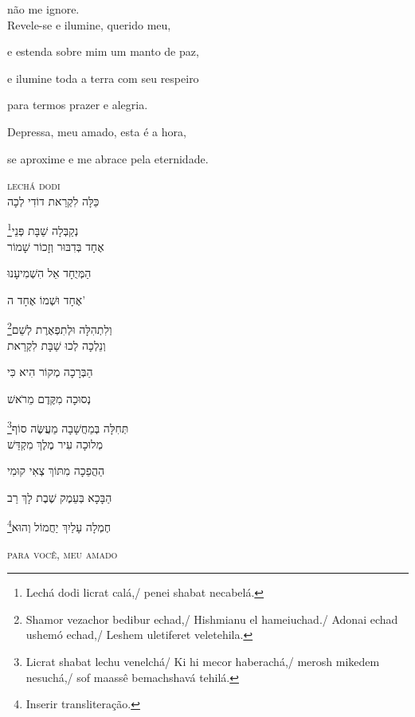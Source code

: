 não me ignore.\\[10pt]

Revele-se e ilumine, querido meu,

e estenda sobre mim um manto de paz,

e ilumine toda a terra com seu respeiro

para termos prazer e alegria. 

Depressa, {meu amado}, esta é a hora,

se aproxime e me abrace pela eternidade.

\movetoevenpage
\raggedleft
{}

\vspace*{1cm}

\textsc{lechá dodi}\\[15pt]

כַּלָּה לִקְרַאת דוֹדִי לְכָה

\footnote{Lechá dodi licrat calá,/ penei shabat necabelá.}נְקַבְּלָה שַׁבָּת פְּנֵי\\[10pt]

אֶחָד בְּדִבּוּר וְזָכוֹר שָׁמוֹר

הַמְּיֻחָד אֵל הִשְׁמִיעָנוּ

אֶחָד וּשְׁמוֹ אֶחָד ה' 

\footnote{Shamor vezachor bedibur echad,/ Hishmianu el hameiuchad./ Adonai echad ushemó echad,/ Leshem uletiferet veletehila.}וְלִתְהִלָּה וּלְתִפְאֶרֶת לְשֵׁם\\[10pt]

וְנֵלְכָה לְכוּ שַׁבָּת לִקְרַאת

הַבְּרָכָה מְקוֹר הִיא כִּי

נְסוּכָה מִקֶּדֶם מֵרֹאשׁ 

\footnote{Licrat shabat lechu venelchá/ Ki hi mecor haberachá,/ merosh mikedem nesuchá,/ sof maassê bemachshavá tehilá.}תְּחִלָּה בְּמַחֲשָׁבָה מַעֲשֶּׂה סוֹף\\[10pt]

מְלוּכָה עִיר מֶלֶךְ  מִקְדַּשׁ

הַהֲפֵכָה מִתּוֹךְ צְאִי קוּמִי 

הַבָּכָא בְּעֵמֶק שֶׁבֶת  לָךְ רַב

\footnote{Inserir transliteração.}חֶמְלָה עָלַיִךְ יַחֲמוֹל  וְהוּא\\[10pt]

\movetooddpage
\raggedright

\vspace*{1cm}
\textsc{para você, meu amado}\\[15pt]



